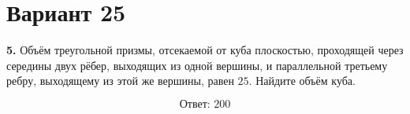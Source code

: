 \documentclass[12pt,a4paper]{article}
\begin{document}
\section*{Вариант 25}

\textbf{5.} Объём треугольной призмы, отсекаемой от куба плоскостью,
проходящей через середины двух рёбер, выходящих из одной вершины,
и параллельной третьему ребру, выходящему из этой же вершины,
равен \(25\). Найдите объём куба.

\begin{center}
\end{center}

\[
\boxed{\text{Ответ: }200}
\]
\end{document}
